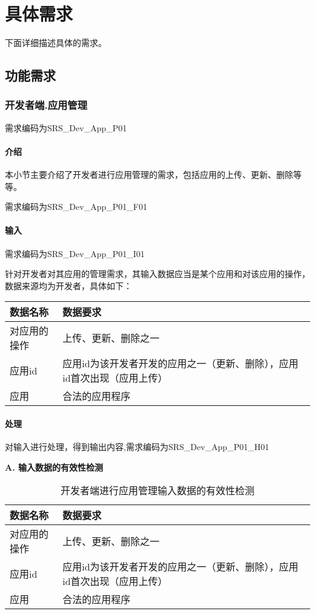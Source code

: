 \chapter{具体需求}
下面详细描述具体的需求。

\section{功能需求}


\subsection{开发者端.应用管理}
需求编码为SRS\_Dev\_App\_P01

\subsubsection{介绍}
本小节主要介绍了开发者进行应用管理的需求，包括应用的上传、更新、删除等等。

需求编码为SRS\_Dev\_App\_P01\_F01

\subsubsection{输入}

需求编码为SRS\_Dev\_App\_P01\_I01

针对开发者对其应用的管理需求，其输入数据应当是某个应用和对该应用的操作，数据来源均为开发者，具体如下：

\begin{longtable}[]{@{}ll@{}}
\toprule
数据名称 & 数据要求\tabularnewline
\midrule
\endhead
对应用的操作 & 上传、更新、删除之一\tabularnewline
应用id & 应用id为该开发者开发的应用之一（更新、删除），应用id首次出现（应用上传）\tabularnewline
应用 & 合法的应用程序 \tabularnewline
\bottomrule
\end{longtable}

\subsubsection{处理}
对输入进行处理，得到输出内容,需求编码为SRS\_Dev\_App\_P01\_H01

\textbf{A. 输入数据的有效性检测}

\begin{longtable}[]{@{}ll@{}}
\caption{开发者端进行应用管理输入数据的有效性检测}\label{tab:developer_app_management}\\
\toprule
数据名称 & 数据要求\tabularnewline
\midrule
\endhead
对应用的操作 & 上传、更新、删除之一\tabularnewline
应用id & 应用id为该开发者开发的应用之一（更新、删除），应用id首次出现（应用上传）\tabularnewline
应用 & 合法的应用程序 \tabularnewline
\bottomrule
\end{longtable}

